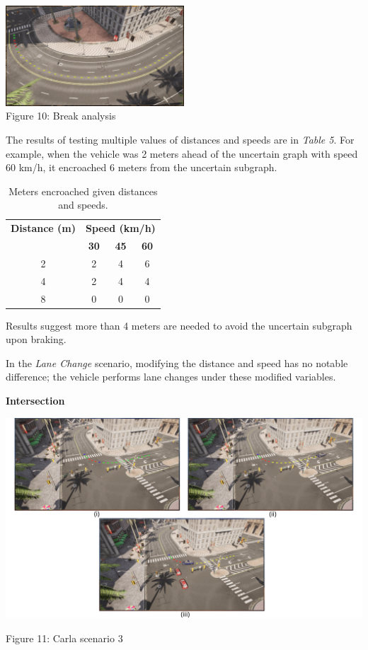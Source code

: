 \begin{center}
  \includegraphics[width=0.5\textwidth]{images/brake-distance.png} \\
  Figure 10: Break analysis
\end{center}

The results of testing multiple values of distances and speeds are in \textit{Table 5}. For example, when the vehicle was 2 meters ahead of the uncertain graph with speed 60 km/h, it encroached 6 meters from the uncertain subgraph.

\begin{table}[h]
\centering
\begin{tabular}{cccc}
\toprule
\multicolumn{1}{c}{\textbf{Distance (m)}} & \multicolumn{3}{c}{\textbf{Speed (km/h)}} \\
\multicolumn{1}{c}{} & \textbf{30} & \textbf{45} & \textbf{60} \\
\midrule
2 & 2 & 4 & 6 \\
4 & 2 & 4 & 4 \\
8 & 0 & 0 & 0 \\
\bottomrule
\end{tabular}
\caption{Meters encroached given distances and speeds.}
\label{table:5}
\end{table}

Results suggest more than 4 meters are needed to avoid the uncertain subgraph upon braking.

In the \textit{Lane Change} scenario, modifying the distance and speed has no notable difference; the vehicle performs lane changes under these modified variables.

\textbf{Intersection}

\includegraphics[width=\textwidth]{images/intersection.png}
\begin{center} Figure 11: Carla scenario 3 \end{center}

